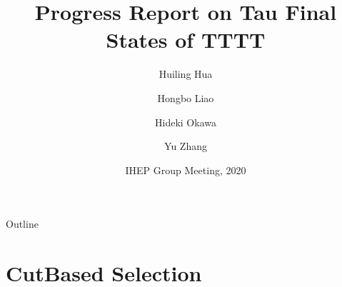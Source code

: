 \documentclass{beamer}
\title[IHEP Group Meeting] %
{Progress Report on Tau Final States of TTTT}
\author[Huiling Hua] %
{Huiling Hua\inst{1} \and Hongbo Liao\inst{1} \and Hideki Okawa\inst{2} \and Yu    Zhang\inst{2}}
\institute[IHEP] %
{
  \inst{1}%
    IHEP
  \and
  \inst{2}%
    Fudan University
}
\date[IHEP 2020] %
{IHEP Group Meeting, 2020}
\begin{document}
\begin{frame}
  \titlepage
\end{frame}

\begin{frame}{Outline}
  \tableofcontents
\end{frame}








\section{CutBased Selection}
\end{document}
